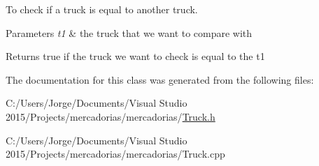To check if a truck is equal to another truck. 


\begin{DoxyParams}{Parameters}
{\em t1} & the truck that we want to compare with \\
\hline
\end{DoxyParams}
\begin{DoxyReturn}{Returns}
true if the truck we want to check is equal to the t1 
\end{DoxyReturn}


The documentation for this class was generated from the following files\+:\begin{DoxyCompactItemize}
\item 
C\+:/\+Users/\+Jorge/\+Documents/\+Visual Studio 2015/\+Projects/mercadorias/mercadorias/\hyperlink{_truck_8h}{Truck.\+h}\item 
C\+:/\+Users/\+Jorge/\+Documents/\+Visual Studio 2015/\+Projects/mercadorias/mercadorias/Truck.\+cpp\end{DoxyCompactItemize}
